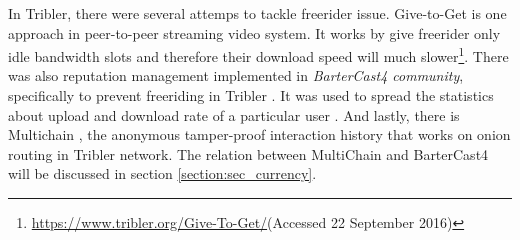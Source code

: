 In Tribler, there were several attemps to tackle freerider issue. Give-to-Get \cite{2008:givetogetvod:Mol} is one approach in peer-to-peer streaming video system. It works by give freerider only idle bandwidth slots and therefore their download speed will much slower\footnote{\url{https://www.tribler.org/Give-To-Get/}(Accessed 22 September 2016)}. There was also reputation management implemented in \textit{BarterCast4 community}, specifically to prevent freeriding in Tribler \cite{2009:bartercast:meulpolder}. It was used to spread the statistics about upload and download rate of a particular user \cite{2016:tribler-techdebt:vos}. And lastly, there is Multichain \cite{2015:multichain:norberhuis}, the anonymous tamper-proof interaction history that works on onion routing in Tribler network. The relation between MultiChain and BarterCast4 will be discussed in section \ref{section:sec_currency}.


